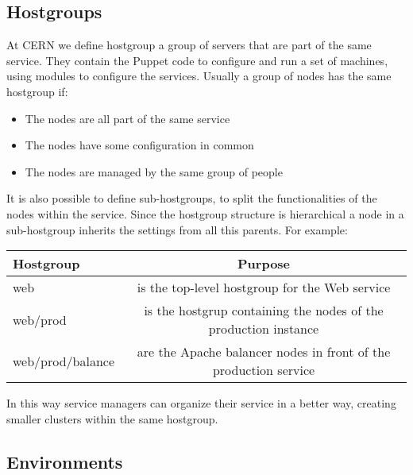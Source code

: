 \subsection{Hostgroups}

At CERN we define hostgroup a group of servers that are part of the same
service. They contain the Puppet code to configure and run a set of
machines, using modules to configure the services. Usually a group of
nodes has the same hostgroup if:

\begin{itemize}

\item The nodes are all part of the same service

\item The nodes have some configuration in common

\item The nodes are managed by the same group of people

\end{itemize}

It is also possible to define sub-hostgroups, to split the functionalities
of the nodes within the service. Since the hostgroup structure is
hierarchical a node in a sub-hostgroup inherits the settings from all this
parents. For example: \newline{} 

\begin{table}[H]
    \begin{center}
    \begin{tabular}{|l|c|}
        \hline
        \textbf{Hostgroup} & \textbf{Purpose} \\
        \hline
        web & is the top-level hostgroup for the Web service \\
        \hline
        web/prod & is the hostgrup containing the nodes of the production instance \\
        \hline
        web/prod/balance & are the Apache balancer nodes in front of the production service \\
        \hline
    \end{tabular}
    \end{center}
\end{table}

In this way service managers can organize their service in a better way,
creating smaller clusters within the same hostgroup.

\subsection{Environments}

